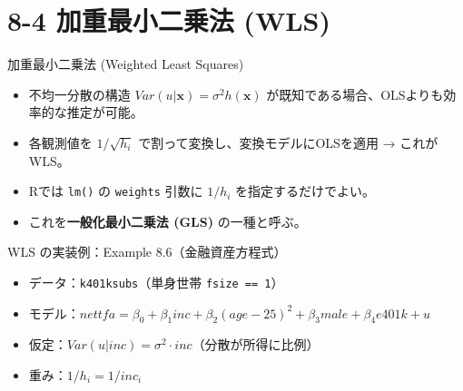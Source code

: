 \documentclass[
  ignorenonframetext,
]{beamer}
\providecommand{\tightlist}{%
  \setlength{\itemsep}{0pt}\setlength{\parskip}{0pt}}
\begin{document}
\section{8-4 加重最小二乗法
(WLS)}\label{ux52a0ux91cdux6700ux5c0fux4e8cux4e57ux6cd5-wls}

\begin{frame}[fragile]{加重最小二乗法 (Weighted Least Squares)}
\label{ux52a0ux91cdux6700ux5c0fux4e8cux4e57ux6cd5-weighted-least-squares}
\begin{itemize}
\tightlist
\item
  不均一分散の構造 \(Var(u|\mathbf{x}) = \sigma^2 h(\mathbf{x})\)
  が既知である場合、OLSよりも効率的な推定が可能。
\item
  各観測値を \(1/\sqrt{h_i}\) で割って変換し、変換モデルにOLSを適用 →
  これがWLS。
\item
  Rでは \texttt{lm()} の \texttt{weights} 引数に \(1/h_i\)
  を指定するだけでよい。
\item
  これを\textbf{一般化最小二乗法 (GLS)} の一種と呼ぶ。
\end{itemize}
\end{frame}

\begin{frame}[fragile]{WLS の実装例：Example 8.6（金融資産方程式）}
\label{wls-ux306eux5b9fux88c5ux4f8bexample-8.6ux91d1ux878dux8cc7ux7523ux65b9ux7a0bux5f0f}
\begin{itemize}
\tightlist
\item
  データ：\texttt{k401ksubs}（単身世帯 \texttt{fsize\ ==\ 1}）
\item
  モデル：\(nettfa = \beta_0 + \beta_1 inc + \beta_2 (age-25)^2 + \beta_3 male + \beta_4 e401k + u\)
\item
  仮定：\(Var(u|inc) = \sigma^2 \cdot inc\)（分散が所得に比例）
\item
  重み：\(1/h_i = 1/inc_i\)
\end{itemize}
\end{frame}
\end{document}

